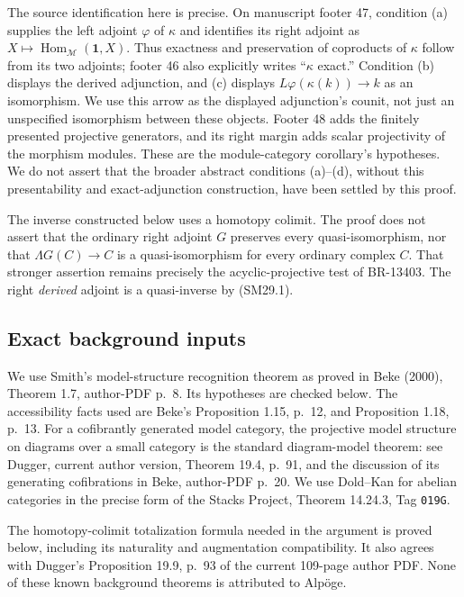 \documentclass[11pt,a4paper]{article}
\theoremstyle{definition}\newtheorem{definition}[theorem]{Definition}
\theoremstyle{remark}\newtheorem{remark}[theorem]{Remark}
\begin{document}
The source identification here is precise.  On manuscript footer 47,
condition (a) supplies the left adjoint \(\varphi\) of \(\kappa\)
and identifies its right adjoint as
\(X\mapsto\operatorname{Hom}_{\mathcal M}(\mathbf1,X)\).
Thus exactness and preservation of coproducts of \(\kappa\) follow
from its two adjoints; footer 46 also explicitly writes
``\(\kappa\) exact.''  Condition (b) displays the derived adjunction,
and (c) displays \(L\varphi(\kappa(k))\to k\) as an isomorphism.
We use this arrow as the displayed adjunction's counit, not just an
unspecified isomorphism between these objects.  Footer 48 adds the
finitely presented projective generators, and its right margin adds
scalar projectivity of the morphism modules.  These are the
module-category corollary's hypotheses.  We do not assert that the
broader abstract conditions (a)--(d), without this presentability
and exact-adjunction construction, have been settled by this proof.

The inverse constructed below uses a homotopy colimit.
The proof does not assert that the ordinary right adjoint \(G\)
preserves every quasi-isomorphism, nor that
\(\Lambda G(C)\to C\) is a quasi-isomorphism for every ordinary
complex \(C\).  That stronger assertion remains precisely the
acyclic-projective test of BR-13403.  The right \emph{derived}
adjoint is a quasi-inverse by (SM29.1).

\subsection{Exact background inputs}
We use Smith's model-structure recognition theorem as proved in
Beke (2000), Theorem 1.7, author-PDF p.~8.
Its hypotheses are checked below.  The accessibility facts used
are Beke's Proposition 1.15, p.~12, and Proposition 1.18, p.~13.
For a cofibrantly generated model category, the projective model
structure on diagrams over a small category is the standard
diagram-model theorem: see Dugger, current author version,
Theorem 19.4, p.~91, and the discussion of its generating
cofibrations in Beke, author-PDF p.~20.
We use Dold--Kan for abelian categories in the precise form of
the Stacks Project, Theorem 14.24.3, Tag \nolinkurl{019G}.

The homotopy-colimit totalization formula needed in the argument
is proved below, including its naturality and augmentation
compatibility.  It also agrees with Dugger's Proposition 19.9,
p.~93 of the current 109-page author PDF.
None of these known background theorems is attributed to Alp\"oge.
\end{document}
